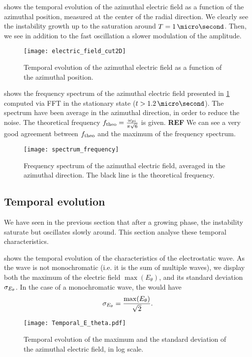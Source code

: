    shows the temporal evolution of the azimuthal electric field as a function of the azimuthal position, measured at the center of the radial direction.
  We clearly see the instability growth up to the saturation around $T=1\,\micro\second$.
  Then, we see in addition to the fast oscillation a slower modulation of the amplitude. 
  \begin{figure}[hbtp]
    \centering
    \texttt{[image: electric\_field\_cut2D]}
    \caption{Temporal evolution of the azimuthal electric field as a function of the azimuthal position.}
    \label{fig-2DcutEx}
  \end{figure}

   shows the frequency spectrum of the azimuthal electric field presented in \cref{fig-2DcutEx} computed via \ac{FFT} in the stationary state ($t > 1.2\,\micro\second$).
  The spectrum have been average in the azimuthal direction, in order to reduce the noise.
  The theoretical frequency $f_{\rm theo} = \frac{\omega_{pi}}{\pi \sqrt{6} }$ is given. {\bf REF}
  We can see a very good agreement between $f_{\rm theo}$ and the maximum of the frequency spectrum.
  \begin{figure}[hbtp]
    \centering
    \texttt{[image: spectrum\_frequency]}
    \caption{Frequency spectrum of the azimuthal electric field, averaged in the azimuthal direction. The black line is the theoretical frequency.}
    \label{fig-FFT_ex}
  \end{figure}
  
  \subsection{Temporal evolution} \label{subsec-temp}
  We have seen in the previous section that after a growing phase, the instability saturate but oscillates slowly around.
  This section analyse these temporal characteristics.
  
   shows the temporal evolution of the characteristics of the electrostatic wave.
  As the wave is not monochromatic (i.e. it is the sum of multiple waves), we display both the maximum of the electric field $\max(E_{\theta})$, and its standard deviation $\sigma_{E_{\theta}}$.
  In the case of a monochromatic wave, the would have 
  \[ \sigma_{E_{\theta}} = \frac{\max(E_{\theta})}{\sqrt{2}}.  \]
  
  \begin{figure}[hbtp]
    \centering
    \texttt{[image: Temporal\_E\_theta.pdf]}
    \caption{Temporal evolution of the maximum and the standard deviation of the azimuthal electric field, in log scale.}
    \label{fig-Ezstd_time}
  \end{figure}
  
